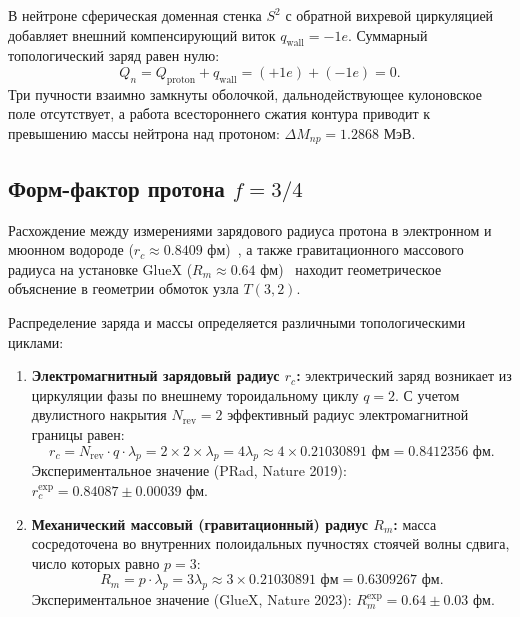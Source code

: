 \documentclass[11pt,a4paper]{article}
\theoremstyle{definition}
\theoremstyle{remark}
\begin{document}
В нейтроне сферическая доменная стенка $S^2$ с обратной вихревой циркуляцией добавляет внешний компенсирующий виток $q_{\mathrm{wall}} = -1e$. Суммарный топологический заряд равен нулю:
\begin{equation}
	Q_n = Q_{\mathrm{proton}} + q_{\mathrm{wall}} = (+1e) + (-1e) = 0.
	\label{eq:neutron_charge_neutral}
\end{equation}
Три пучности взаимно замкнуты оболочкой, дальнодействующее кулоновское поле отсутствует, а работа всестороннего сжатия контура приводит к превышению массы нейтрона над протоном: $\Delta M_{np} = 1.2868\text{ МэВ}$.
	
\subsection{Форм-фактор протона $f = 3/4$}
	
Расхождение между измерениями зарядового радиуса протона в электронном и мюонном водороде ($r_c \approx 0.8409\text{ фм}$)~\cite{PRad2019}, а также гравитационного массового радиуса на установке GlueX ($R_m \approx 0.64\text{ фм}$)~\cite{GlueX2023} находит геометрическое объяснение в геометрии обмоток узла $T(3,2)$.
	
Распределение заряда и массы определяется различными топологическими циклами:
\begin{enumerate}
	\item \textbf{Электромагнитный зарядовый радиус $r_c$:} электрический заряд возникает из циркуляции фазы по внешнему тороидальному циклу $q=2$. С учетом двулистного накрытия $N_{\mathrm{rev}} = 2$ эффективный радиус электромагнитной границы равен:
\begin{equation}
	r_c = N_{\mathrm{rev}} \cdot q \cdot \lambda_p = 2 \times 2 \times \lambda_p = 4 \lambda_p \approx 4 \times 0.21030891\text{ фм} = 0.8412356\text{ фм}.
	\label{eq:charge_radius_formula}
\end{equation}
Экспериментальное значение (PRad, Nature 2019): $r_c^{\mathrm{exp}} = 0.84087 \pm 0.00039\text{ фм}$.
		
\item \textbf{Механический массовый (гравитационный) радиус $R_m$:} масса сосредоточена во внутренних полоидальных пучностях стоячей волны сдвига, число которых равно $p=3$:
\begin{equation}
	R_m = p \cdot \lambda_p = 3 \lambda_p \approx 3 \times 0.21030891\text{ фм} = 0.6309267\text{ фм}.
	\label{eq:mass_radius_formula}
\end{equation}
Экспериментальное значение (GlueX, Nature 2023): $R_m^{\mathrm{exp}} = 0.64 \pm 0.03\text{ фм}$.
\end{enumerate}
	
\end{document}
